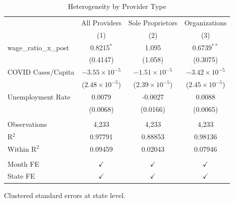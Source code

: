 
\begin{table}[htbp]
   \caption{\label{tab:heterogeneity} Heterogeneity by Provider Type}
   \bigskip
   \centering
   \begin{tabular}{lccc}
      \toprule
                              & All Providers           & Sole Proprietors        & Organizations \\   
                              & (1)                     & (2)                     & (3)\\  
      \midrule 
      wage\_ratio\_x\_post    & 0.8215$^{*}$            & 1.095                   & 0.6739$^{**}$\\   
                              & (0.4147)                & (1.058)                 & (0.3075)\\   
      COVID Cases/Capita      & $-3.55\times 10^{-5}$   & $-1.51\times 10^{-5}$   & $-3.42\times 10^{-5}$\\    
                              & ($2.48\times 10^{-5}$)  & ($2.39\times 10^{-5}$)  & ($2.45\times 10^{-5}$)\\    
      Unemployment Rate       & 0.0079                  & -0.0027                 & 0.0088\\   
                              & (0.0068)                & (0.0166)                & (0.0065)\\   
       \\
      Observations            & 4,233                   & 4,233                   & 4,233\\  
      R$^2$                   & 0.97791                 & 0.88853                 & 0.98136\\  
      Within R$^2$            & 0.09459                 & 0.02043                 & 0.07946\\  
       \\
      Month FE                & $\checkmark$            & $\checkmark$            & $\checkmark$\\   
      State FE                & $\checkmark$            & $\checkmark$            & $\checkmark$\\   
      \bottomrule
   \end{tabular}
   
   \par \raggedright 
   Clustered standard errors at state level.
\end{table}


